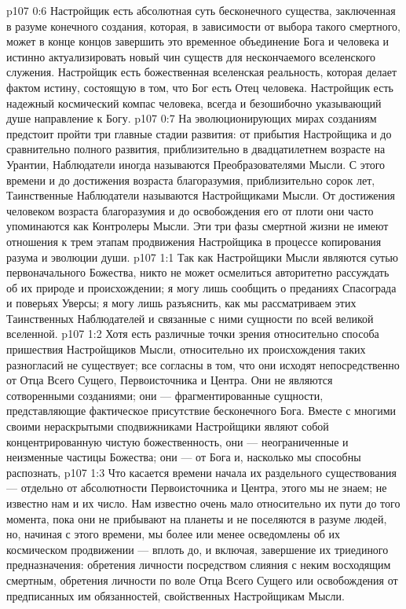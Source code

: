 \vs p107 0:6 Настройщик есть абсолютная суть бесконечного существа, заключенная в разуме конечного создания, которая, в зависимости от выбора такого смертного, может в конце концов завершить это временное объединение Бога и человека и истинно актуализировать новый чин существ для нескончаемого вселенского служения. Настройщик есть божественная вселенская реальность, которая делает фактом истину, состоящую в том, что Бог есть Отец человека. Настройщик есть надежный космический компас человека, всегда и безошибочно указывающий душе направление к Богу.
\vs p107 0:7 \pc На эволюционирующих мирах созданиям предстоит пройти три главные стадии развития: от прибытия Настройщика и до сравнительно полного развития, приблизительно в двадцатилетнем возрасте на Урантии, Наблюдатели иногда называются Преобразователями Мысли. С этого времени и до достижения возраста благоразумия, приблизительно сорок лет, Таинственные Наблюдатели называются Настройщиками Мысли. От достижения человеком возраста благоразумия и до освобождения его от плоти они часто упоминаются как Контролеры Мысли. Эти три фазы смертной жизни не имеют отношения к трем этапам продвижения Настройщика в процессе копирования разума и эволюции души.
\vs p107 1:1 Так как Настройщики Мысли являются сутью первоначального Божества, никто не может осмелиться авторитетно рассуждать об их природе и происхождении; я могу лишь сообщить о преданиях Спасограда и поверьях Уверсы; я могу лишь разъяснить, как мы рассматриваем этих Таинственных Наблюдателей и связанные с ними сущности по всей великой вселенной.
\vs p107 1:2 Хотя есть различные точки зрения относительно способа пришествия Настройщиков Мысли, относительно их происхождения таких разногласий не существует; все согласны в том, что они исходят непосредственно от Отца Всего Сущего, Первоисточника и Центра. Они не являются сотворенными созданиями; они --- фрагментированные сущности, представляющие фактическое присутствие бесконечного Бога. Вместе с многими своими нераскрытыми сподвижниками Настройщики являют собой концентрированную чистую божественность, они --- неограниченные и неизменные частицы Божества; они --- от Бога и, насколько мы способны распознать, 
\vs p107 1:3 Что касается времени начала их раздельного существования --- отдельно от абсолютности Первоисточника и Центра, этого мы не знаем; не известно нам и их число. Нам известно очень мало относительно их пути до того момента, пока они не прибывают на планеты и не поселяются в разуме людей, но, начиная с этого времени, мы более или менее осведомлены об их космическом продвижении --- вплоть до, и включая, завершение их триединого предназначения: обретения личности посредством слияния с неким восходящим смертным, обретения личности по воле Отца Всего Сущего или освобождения от предписанных им обязанностей, свойственных Настройщикам Мысли.
